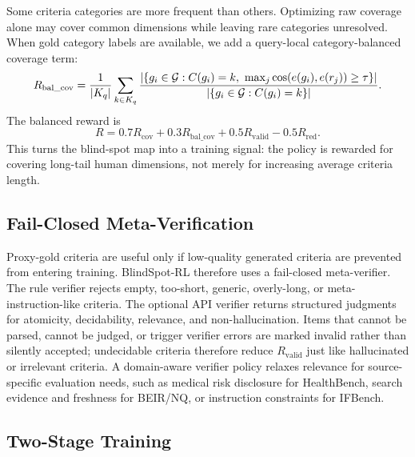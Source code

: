 Some criteria categories are more frequent than others. Optimizing raw coverage
alone may cover common dimensions while leaving rare categories unresolved.
When gold category labels are available, we add a query-local
category-balanced coverage term:
\[
R_{\mathrm{bal\_cov}} =
\frac{1}{|K_q|}\sum_{k \in K_q}
\frac{|\{g_i \in \mathcal{G}: C(g_i)=k,\ \max_j \cos(e(g_i), e(r_j)) \ge \tau\}|}
{|\{g_i \in \mathcal{G}: C(g_i)=k\}|}.
\]
The balanced reward is
\[
R =
0.7R_{\mathrm{cov}} + 0.3R_{\mathrm{bal\_cov}}
+ 0.5R_{\mathrm{valid}} - 0.5R_{\mathrm{red}}.
\]
This turns the blind-spot map into a training signal: the policy is rewarded
for covering long-tail human dimensions, not merely for increasing average
criteria length.

\subsection{Fail-Closed Meta-Verification}

Proxy-gold criteria are useful only if low-quality generated criteria are
prevented from entering training. BlindSpot-RL therefore uses a fail-closed
meta-verifier. The rule verifier rejects empty, too-short, generic,
overly-long, or meta-instruction-like criteria. The optional API verifier
returns structured judgments for atomicity, decidability, relevance, and
non-hallucination. Items that cannot be parsed, cannot be judged, or trigger
verifier errors are marked invalid rather than silently accepted; undecidable
criteria therefore reduce $R_{\mathrm{valid}}$ just like hallucinated or
irrelevant criteria. A
domain-aware verifier policy relaxes relevance for source-specific evaluation
needs, such as medical risk disclosure for HealthBench, search evidence and
freshness for BEIR/NQ, or instruction constraints for IFBench.

\subsection{Two-Stage Training}

